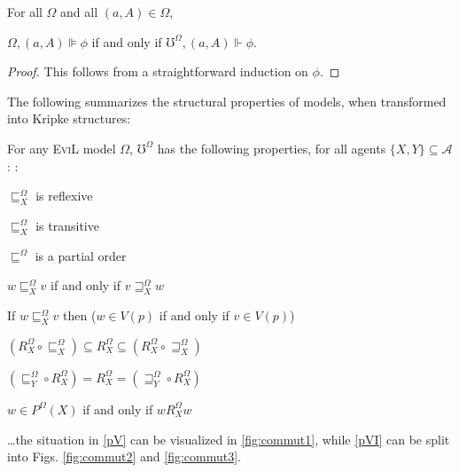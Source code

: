 \begin{lemma}
  \label{tranlemma1} For all $\Omega$ and all $(a, A) \in \Omega$,  
\begin{center} 
$\Omega, (a, A) \VDash \phi$ if and only if $\mho^{\Omega}, (a, A) \Vdash \phi$.
\end{center}
\end{lemma}
\begin{proof}
  This follows from a straightforward induction on $\phi$.
\end{proof}
The following summarizes the structural properties of
 models, when transformed into Kripke structures:
\begin{proposition}\label{evil_models}
  For any \textsc{EviL} model $\Omega$,  $\mho^{\Omega}$ has the following
  properties, for all agents $\{X,Y\} \subseteq \mathcal{A}$:
:
  \begin{myRoman}
    \item\label{pI} $\sqsubseteq^{\Omega}_X$ is reflexive
    \item\label{pII} $\sqsubseteq^{\Omega}_X$ is transitive 
   \item \label{pantisym} $\sqsubseteq^{\Omega}$ is a partial order
    \item \label{preverse} $w \sqsubseteq^{\Omega}_X v$ if and only if 
     $v \sqsupseteq^{\Omega}_X w$
    \item \label{pislandiff} If $w \sqsubseteq^{\Omega}_X v$ then ($w
      \in V (p)$ if and only if $v \in V (p)$)
    \item \label{pV}$(R^{\Omega}_X \circ \sqsubseteq^{\Omega}_X) \subseteq
    R^{\Omega}_X \subseteq (R^{\Omega}_X \circ \sqsupseteq^{\Omega}_X)$
    \item \label{pVI} $(\sqsubseteq^{\Omega}_Y \circ R^{\Omega}_X) = R^{\Omega}_X =
    (\sqsupseteq^{\Omega}_Y \circ R^{\Omega}_X)$
    \item\label{pVII} $w \in P^{\Omega} (X)$ if and only if $w
    R^{\Omega}_X w$
  \end{myRoman}
  \ldots the situation in \ref{pV} can be visualized in
  \ref{fig:commut1}, while \ref{pVI} can be split into
  Figs. \ref{fig:commut2} and \ref{fig:commut3}.
\end{proposition}
